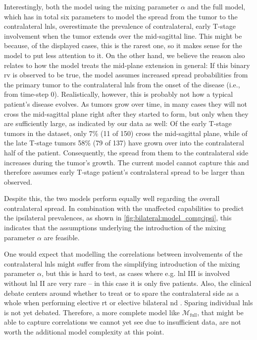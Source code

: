 \documentclass[\relativeRoot/main.tex]{subfiles}
\begin{document}
Interestingly, both the model using the mixing parameter $\alpha$ and the full model, which has in total six parameters to model the spread from the tumor to the contralateral \glspl{lnl}, overestimate the prevalence of contralateral, early T-stage involvement when the tumor extends over the mid-sagittal line. This might be because, of the displayed cases, this is the rarest one, so it makes sense for the model to put less attention to it. On the other hand, we believe the reason also relates to how the model treats the mid-plane extension in general: If this binary \gls{rv} is observed to be true, the model assumes increased spread probabilities from the primary tumor to the contralateral \glspl{lnl} from the onset of the disease (i.e., from time-step 0). Realistically, however, this is probably not how a typical patient's disease evolves. As tumors grow over time, in many cases they will not cross the mid-sagittal plane right after they started to form, but only when they are sufficiently large, as indicated by our data as well: Of the early T-stage tumors in the dataset, only 7\% (11 of 150) cross the mid-sagittal plane, while of the late T-stage tumors 58\% (79 of 137) have grown over into the contralateral half of the patient. Consequently, the spread from them to the contralateral side increases during the tumor's growth. The current model cannot capture this and therefore assumes early T-stage patient's contralateral spread to be larger than observed.

Despite this, the two models perform equally well regarding the overall contralateral spread. In combination with the unaffected capabilities to predict the ipsilateral prevalences, as shown in \cref{fig:bilateral:model_comp:ipsi}, this indicates that the assumptions underlying the introduction of the mixing parameter $\alpha$ are feasible.

One would expect that modelling the correlations between involvements of the contralateral \glspl{lnl} might suffer from the simplifying introduction of the mixing parameter $\alpha$, but this is hard to test, as cases where e.g. \gls{lnl} III is involved without \gls{lnl} II are very rare -- in this case it is only five patients. Also, the clinical debate centers around whether to treat or to spare the contralateral side as a whole when performing elective \gls{rt} or elective bilateral \gls{nd} \cite{biau_selection_2019,al-mamgani_contralateral_2017}. Sparing individual \glspl{lnl} is not yet debated. Therefore, a more complete model like $\mathcal{M}_\text{full}$, that might be able to capture correlations we cannot yet see due to insufficient data, are not worth the additional model complexity at this point.
\end{document}
